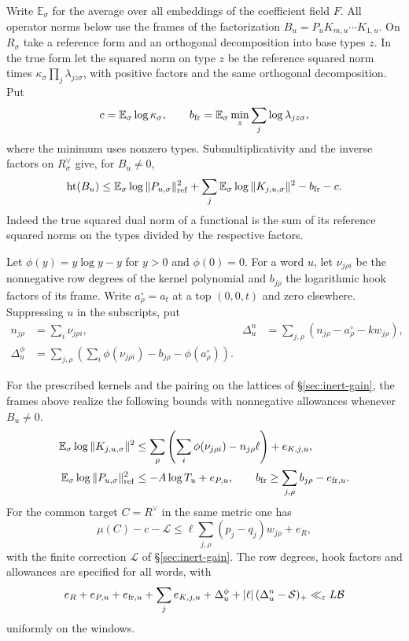 Write $\mathbb E_\sigma$ for the average over all embeddings of the
coefficient field $F$. All operator norms below use the frames of the
factorization $B_u=P_uK_{m,u}\cdots K_{1,u}$. On $R_\sigma$ take a
reference form and an orthogonal decomposition into base types $z$.
In the true form let the squared norm on type $z$ be the reference
squared norm times $\kappa_\sigma\prod_j\lambda_{jz\sigma}$, with
positive factors and the same orthogonal decomposition. Put
\[
 c=\mathbb E_\sigma\log\kappa_\sigma,\qquad
 b_{\rm fr}=\mathbb E_\sigma\min_z\sum_j\log\lambda_{jz\sigma},
\]
where the minimum uses nonzero types. Submultiplicativity and the
inverse factors on $R_\sigma^\vee$ give, for $B_u\ne0$,
\begin{equation}\label{eq:height-product}
 \operatorname{ht}(B_u)\le
 \mathbb E_\sigma\log\|P_{u,\sigma}\|_{\rm ref}^2+
 \sum_j\mathbb E_\sigma\log\|K_{j,u,\sigma}\|^2-b_{\rm fr}-c .
\end{equation}
Indeed the true squared dual norm of a functional is the sum of its
reference squared norms on the types divided by the respective factors.

Let $\phi(y)=y\log y-y$ for $y>0$ and $\phi(0)=0$.
For a word $u$, let $\nu_{j\rho i}$ be the nonnegative row degrees
of the kernel polynomial and $b_{j\rho}$ the logarithmic hook factors
of its frame. Write $a_\rho^\circ=a_t$ at a top $(0,0,t)$ and zero
elsewhere. Suppressing $u$ in the subscripts, put
\begin{align*}
 n_{j\rho}&=\sum_i\nu_{j\rho i},&
 \Delta_u^n&=\sum_{j,\rho}(n_{j\rho}-a_\rho^\circ-k w_{j\rho}),\\
 \Delta_u^\phi&=\sum_{j,\rho}
       \left(\sum_i\phi(\nu_{j\rho i})-b_{j\rho}
                                      -\phi(a_\rho^\circ)\right).
\end{align*}

\begin{hypothesis}[\openinput]\label{hyp:height-norms}
For the prescribed kernels and the pairing on the lattices of
\S\ref{sec:inert-gain}, the frames above realize the following
bounds with nonnegative allowances whenever $B_u\ne0$.
\begin{align*}
 \mathbb E_\sigma\log\|K_{j,u,\sigma}\|^2
 &\le \sum_\rho\left(\sum_i\phi(\nu_{j\rho i})-n_{j\rho}\ell\right)
           +e_{K,j,u},\\
 \mathbb E_\sigma\log\|P_{u,\sigma}\|_{\rm ref}^2
 &\le -A\log T_u+e_{P,u},\qquad
 b_{\rm fr}\ge\sum_{j,\rho}b_{j\rho}-e_{{\rm fr},u}.
\end{align*}
For the common target $C=R^\vee$ in the same metric one has
\[
 \mu(C)-c-\mathcal L\le
       \ell\sum_{j,\rho}(p_j-q_j)w_{j\rho}+e_R,
\]
with the finite correction $\mathcal L$ of \S\ref{sec:inert-gain}.
The row degrees, hook factors and allowances are specified for all
words, with
\[
 e_R+e_{P,u}+e_{{\rm fr},u}+\sum_j e_{K,j,u}
                +\Delta_u^\phi+|\ell|\,(\Delta_u^n-\mathcal S)_+
       \ll_\varepsilon L\mathcal B
\]
uniformly on the windows.
\end{hypothesis}

